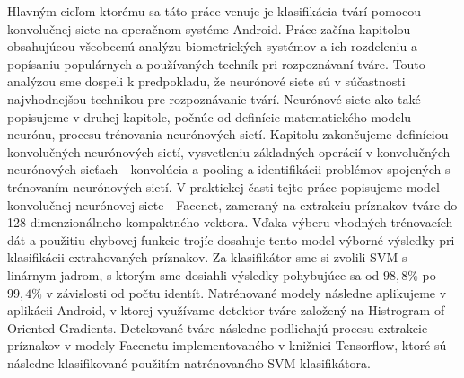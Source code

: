 Hlavným cieľom ktorému sa táto práce venuje je klasifikácia tvárí pomocou konvolučnej siete na operačnom systéme Android.
Práce začína kapitolou obsahujúcou všeobecnú analýzu biometrických systémov a ich rozdeleniu a popísaniu populárnych a používaných techník pri rozpoznávaní tváre.
Touto analýzou sme dospeli k predpokladu, že neurónové siete sú v súčastnosti najvhodnejšou technikou pre rozpoznávanie tvárí.
Neurónové siete ako také popisujeme v druhej kapitole, počnúc od definície matematického modelu neurónu, procesu trénovania neurónových sietí.
Kapitolu zakončujeme definíciou konvolučných neurónových sietí, vysvetleniu základných operácií v konvolučných neurónových sieťach - konvolúcia a pooling a identifikácii problémov spojených s trénovaním neurónových sietí.
V praktickej časti tejto práce popisujeme model konvolučnej neurónovej siete - Facenet, zameraný na extrakciu príznakov tváre do 128-dimenzionálneho kompaktného vektora.
Vďaka výberu vhodných trénovacích dát a použitiu chybovej funkcie trojíc dosahuje tento model výborné výsledky pri klasifikácii extrahovaných príznakov.
Za klasifikátor sme si zvolili SVM s linárnym jadrom, s ktorým sme dosiahli výsledky pohybujúce sa od $ 98,8\% $ po $ 99,4\% $ v závislosti od počtu identít.
Natrénované modely následne aplikujeme v aplikácii Android, v ktorej využívame detektor tváre založený na Histrogram of Oriented Gradients.
Detekované tváre následne podliehajú procesu extrakcie príznakov v modely Facenetu implementovaného v knižnici Tensorflow, ktoré sú následne klasifikované použitím natrénovaného SVM klasifikátora.
